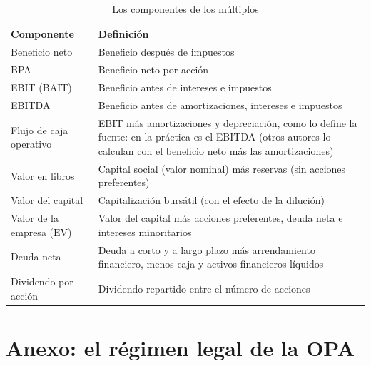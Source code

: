 \documentclass[11pt]{article}
\begin{document}
\begin{table}[H]
\centering
\caption{Los componentes de los múltiplos}\label{tab:multiplos-glosario}
\begin{tabular}{>{\raggedright\arraybackslash}m{4.2cm}>{\raggedright\arraybackslash}m{9.6cm}}
\toprule
\rowcolor{tceeazulpalido}\textbf{Componente} & \textbf{Definición} \\
\midrule
Beneficio neto & Beneficio después de impuestos \\
BPA & Beneficio neto por acción \\
EBIT (BAIT) & Beneficio antes de intereses e impuestos \\
EBITDA & Beneficio antes de amortizaciones, intereses e impuestos \\
Flujo de caja operativo & EBIT más amortizaciones y depreciación, como lo define la fuente: en la práctica es el EBITDA (otros autores lo calculan con el beneficio neto más las amortizaciones) \\
Valor en libros & Capital social (valor nominal) más reservas (sin acciones preferentes) \\
Valor del capital & Capitalización bursátil (con el efecto de la dilución) \\
Valor de la empresa ($\mathrm{EV}$) & Valor del capital más acciones preferentes, deuda neta e intereses minoritarios \\
Deuda neta & Deuda a corto y a largo plazo más arrendamiento financiero, menos caja y activos financieros líquidos \\
Dividendo por acción & Dividendo repartido entre el número de acciones \\
\bottomrule
\end{tabular}
\end{table}

\section{Anexo: el régimen legal de la OPA}\label{anexo:opa}
\end{document}
